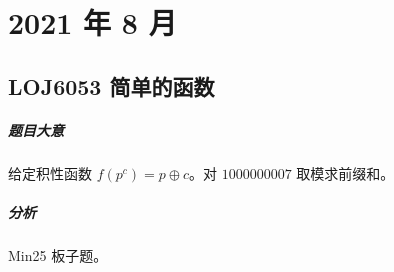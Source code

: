 \chapter{2021 年 8 月}

\section{LOJ6053 简单的函数}

\paragraph{题目大意}

给定积性函数 $f(p^c) = p \oplus c$。对 $1000000007$ 取模求前缀和。

\paragraph{分析}

Min25 板子题。
